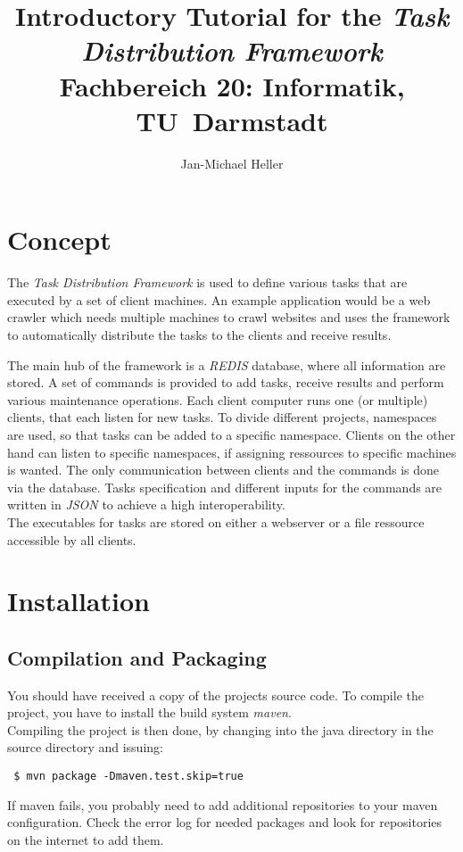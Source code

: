 \documentclass[a4paper,11pt]{article}
\title{Introductory Tutorial for the \textit{Task Distribution Framework}
Fachbereich 20: Informatik, \mbox{TU Darmstadt}}
\author{Jan-Michael Heller}
\begin{document}
\maketitle

\tableofcontents

\section{Concept}
The \textit{Task Distribution Framework} is used to define various tasks that are executed by a set of client machines. An example application would be a web crawler which needs multiple machines to crawl websites and uses the framework to automatically distribute the tasks to the clients and receive results.

The main hub of the framework is a \textit{REDIS} database, where all information are stored. A set of commands is provided to add tasks, receive results and perform various maintenance operations. Each client computer runs one (or multiple) clients, that each listen for new tasks. To divide different projects, namespaces are used, so that tasks can be added to a specific namespace. Clients on the other hand can listen to specific namespaces, if assigning ressources to specific machines is wanted. The only communication between clients and the commands is done via the database. Tasks specification and different inputs for the commands are written in \textit{JSON} to achieve a high interoperability.\\
The executables for tasks are stored on either a webserver or a file ressource accessible by all clients.

\section{Installation}
\subsection{Compilation and Packaging}
You should have received a copy of the projects source code. To compile the project, you have to install the build system \textit{maven}.\\
Compiling the project is then done, by changing into the java directory in the source directory and issuing:
\begin{verbatim}
 $ mvn package -Dmaven.test.skip=true
\end{verbatim}
If maven fails, you probably need to add additional repositories to your maven configuration. Check the error log for needed packages and look for repositories on the internet to add them.
\end{document}
